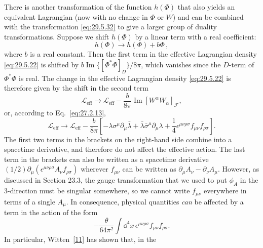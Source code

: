 There is another transformation of the function \(h(\Phi)\) that also yields
an equivalent Lagrangian (now with no change in \(\Phi\) or \(W\)) and can be
combined with the transformation \eqref{eq:29.5.32} to give a larger group of
duality transformations. Suppose we shift \(h(\Phi)\) by a linear term with
a real coefficient:
\begin{equation}
  h(\Phi)\longrightarrow h(\Phi)+b\Phi\,,
  \tag{29.5.35}\label{eq:29.5.35}
\end{equation}
where \(b\) is a real constant. Then the first term in the effective
Lagrangian density \eqref{eq:29.5.22} is shifted by
\(b\operatorname{Im}\{[\Phi^*\Phi]_D\}/8\pi\), which vanishes since the
\(D\)-term of \(\Phi^*\Phi\) is real. The change in the effective Lagrangian
density \eqref{eq:29.5.22} is therefore given by the shift in the second term
\begin{equation}
  \mathcal{L}_{\mathrm{eff}}\longrightarrow\mathcal{L}_{\mathrm{eff}}
  -\frac{b}{8\pi}\operatorname{Im}
    \left[W^\alpha W_\alpha\right]_{\mathcal F},
  \tag{29.5.36}\label{eq:29.5.36}
\end{equation}
or, according to Eq.~\eqref{eq:27.2.13},
\begin{equation}
  \mathcal{L}_{\mathrm{eff}}\longrightarrow\mathcal{L}_{\mathrm{eff}}
  -\frac{b}{8\pi}\left[
    -\lambda\sigma^\mu\partial_\mu\bar\lambda
    +\bar\lambda\bar\sigma^\mu\partial_\mu\lambda
    +\frac14\epsilon^{\mu\nu\rho\sigma}f_{\mu\nu}f_{\rho\sigma}
  \right].
  \tag{29.5.37}\label{eq:29.5.37}
\end{equation}
The first two terms in the brackets on the right-hand side combine into a
spacetime derivative, and therefore do not affect the effective action.
The last term in the brackets can also be written as a spacetime derivative
\((1/2)\partial_\mu(\epsilon^{\mu\nu\rho\sigma}A_\nu f_{\rho\sigma})\)
wherever \(f_{\mu\nu}\) can be written as
\(\partial_\mu A_\nu-\partial_\nu A_\mu\). However, as discussed in Section
23.3, the gauge transformation that we used to put \(\phi_A\) in the
3-direction must be singular somewhere, so we cannot write \(f_{\mu\nu}\)
everywhere in terms of a single \(A_\mu\). In consequence, physical
quantities \textit{can} be affected by a term in the action of the form
\begin{equation}
  -\frac{\theta}{64\pi^2}\int \dd^4x\,
    \epsilon^{\mu\nu\rho\sigma}f_{\mu\nu}f_{\rho\sigma}.
  \tag{29.5.38}\label{eq:29.5.38}
\end{equation}
In particular, Witten~\hyperref[ch29-ref-11]{[11]} has shown that, in the
